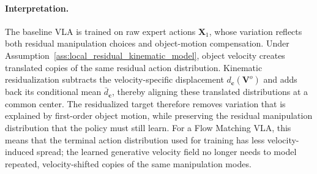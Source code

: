 \documentclass{article} %
\begin{document}
\paragraph{Interpretation.}
The baseline VLA is trained on raw expert actions $\mathbf X_1$, whose
variation reflects both residual manipulation choices and object-motion
compensation. Under Assumption~\ref{ass:local_residual_kinematic_model}, object
velocity creates translated copies of the same residual action distribution.
Kinematic residualization subtracts the velocity-specific displacement
$d_{\mathbf c}(\mathbf V^{o})$ and adds back its conditional mean
$\bar d_{\mathbf c}$, thereby aligning these translated distributions at a
common center. The residualized target therefore removes variation that is
explained by first-order object motion, while preserving the residual
manipulation distribution that the policy must still learn. For a Flow Matching
VLA, this means that the terminal action distribution used for training has less
velocity-induced spread; the learned generative velocity field no longer needs
to model repeated, velocity-shifted copies of the same manipulation modes.
\end{document}
